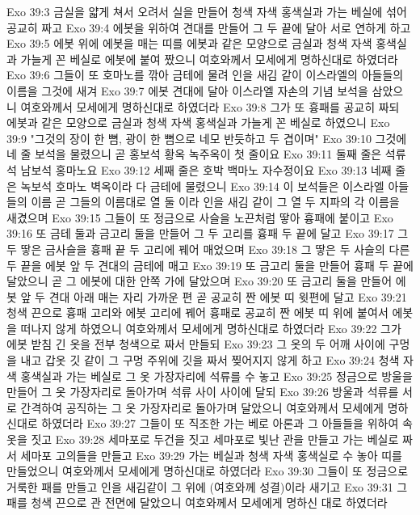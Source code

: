 Exo 39:3  금실을 얇게 쳐서 오려서 실을 만들어 청색 자색 홍색실과 가는 베실에 섞어 공교히 짜고
Exo 39:4  에봇을 위하여 견대를 만들어 그 두 끝에 달아 서로 연하게 하고
Exo 39:5  에봇 위에 에봇을 매는 띠를 에봇과 같은 모양으로 금실과 청색 자색 홍색실과 가늘게 꼰 베실로 에봇에 붙여 짰으니 여호와께서 모세에게 명하신대로 하였더라
Exo 39:6  그들이 또 호마노를 깎아 금테에 물려 인을 새김 같이 이스라엘의 아들들의 이름을 그것에 새겨
Exo 39:7  에봇 견대에 달아 이스라엘 자손의 기념 보석을 삼았으니 여호와께서 모세에게 명하신대로 하였더라
Exo 39:8  그가 또 흉패를 공교히 짜되 에봇과 같은 모양으로 금실과 청색 자색 홍색실과 가늘게 꼰 베실로 하였으니
Exo 39:9  "그것의 장이 한 뼘, 광이 한 뼘으로 네모 반듯하고 두 겹이며"
Exo 39:10  그것에 네 줄 보석을 물렸으니 곧 홍보석 황옥 녹주옥이 첫 줄이요
Exo 39:11  둘째 줄은 석류석 남보석 홍마노요
Exo 39:12  세째 줄은 호박 백마노 자수정이요
Exo 39:13  네째 줄은 녹보석 호마노 벽옥이라 다 금테에 물렸으니
Exo 39:14  이 보석들은 이스라엘 아들들의 이름 곧 그들의 이름대로 열 둘 이라 인을 새김 같이 그 열 두 지파의 각 이름을 새겼으며
Exo 39:15  그들이 또 정금으로 사슬을 노끈처럼 땋아 흉패에 붙이고
Exo 39:16  또 금테 둘과 금고리 둘을 만들어 그 두 고리를 흉패 두 끝에 달고
Exo 39:17  그 두 땋은 금사슬을 흉패 끝 두 고리에 꿰어 매었으며
Exo 39:18  그 땋은 두 사슬의 다른 두 끝을 에봇 앞 두 견대의 금테에 매고
Exo 39:19  또 금고리 둘을 만들어 흉패 두 끝에 달았으니 곧 그 에봇에 대한 안쪽 가에 달았으며
Exo 39:20  또 금고리 둘을 만들어 에봇 앞 두 견대 아래 매는 자리 가까운 편 곧 공교히 짠 에봇 띠 윗편에 달고
Exo 39:21  청색 끈으로 흉패 고리와 에봇 고리에 꿰어 흉패로 공교히 짠 에봇 띠 위에 붙여서 에봇을 떠나지 않게 하였으니 여호와께서 모세에게 명하신대로 하였더라
Exo 39:22  그가 에봇 받침 긴 옷을 전부 청색으로 짜서 만들되
Exo 39:23  그 옷의 두 어깨 사이에 구멍을 내고 갑옷 깃 같이 그 구멍 주위에 깃을 짜서 찢어지지 않게 하고
Exo 39:24  청색 자색 홍색실과 가는 베실로 그 옷 가장자리에 석류를 수 놓고
Exo 39:25  정금으로 방울을 만들어 그 옷 가장자리로 돌아가며 석류 사이 사이에 달되
Exo 39:26  방울과 석류를 서로 간격하여 공직하는 그 옷 가장자리로 돌아가며 달았으니 여호와께서 모세에게 명하신대로 하였더라
Exo 39:27  그들이 또 직조한 가는 베로 아론과 그 아들들을 위하여 속옷을 짓고
Exo 39:28  세마포로 두건을 짓고 세마포로 빛난 관을 만들고 가는 베실로 짜서 세마포 고의들을 만들고
Exo 39:29  가는 베실과 청색 자색 홍색실로 수 놓아 띠를 만들었으니 여호와께서 모세에게 명하신대로 하였더라
Exo 39:30  그들이 또 정금으로 거룩한 패를 만들고 인을 새김같이 그 위에 (여호와께 성결)이라 새기고
Exo 39:31  그 패를 청색 끈으로 관 전면에 달았으니 여호와께서 모세에게 명하신 대로 하였더라
